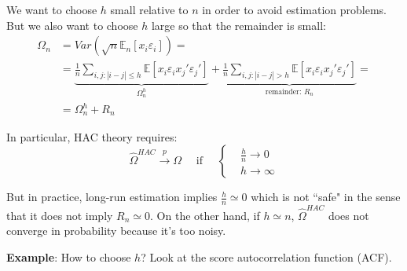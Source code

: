 \documentclass[12pt,]{book}
\newenvironment{Shaded}{\begin{snugshade}}{\end{snugshade}}
\newcommand{\CommentTok}[1]{\textcolor[rgb]{0.56,0.35,0.01}{\textit{#1}}}
\newcommand{\FloatTok}[1]{\textcolor[rgb]{0.00,0.00,0.81}{#1}}
\newcommand{\NormalTok}[1]{#1}
\begin{document}
We want to choose \(h\) small relative to \(n\) in order to avoid estimation problems. But we also want to choose \(h\) large so that the remainder is small:
\[
\begin{aligned}
  \Omega_n &= Var(\sqrt{n} \mathbb E_n[x_i \varepsilon_i]) = \\
  &= \underbrace{\frac{1}{n} \sum _ {i,j : |i-j|\leq h} \mathbb E[x_i \varepsilon_i x_j' \varepsilon_j']} _ {\Omega^h_n} + \underbrace{\frac{1}{n} \sum _ {i,j : |i-j|> h} \mathbb E[x_i \varepsilon_i x_j' \varepsilon_j']} _ {\text{remainder: } R_n} = \\
  &= \Omega_n^h + R_n
\end{aligned}
\]

In particular, HAC theory requires:
\[
    \hat{\Omega}^{HAC} \overset{p}{\to} \Omega \quad \text{ if } \quad 
    \begin{cases}
    & \frac{h}{n} \to 0 \\
    & h \to \infty
    \end{cases}
\]

But in practice, long-run estimation implies \(\frac{h}{n} \simeq 0\) which is not ``safe" in the sense that it does not imply \(R_n \simeq 0\).
On the other hand, if \(h \simeq n\), \(\hat{\Omega}^{HAC}\) does not converge in probability because it's too noisy.

\textbf{Example}:
How to choose \(h\)? Look at the score autocorrelation function (ACF).

\begin{Shaded}
\end{Shaded}
\end{document}
